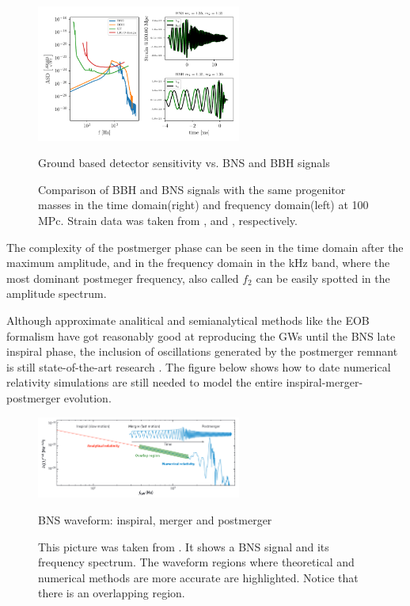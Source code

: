 \begin{figure}[hbt!]
\begin{center}
\includegraphics[width=0.6\textwidth, angle=0]{images/Data_analysis/sig_proc/BNS-BBH.pdf}
\captionsetup{width=0.8\textwidth}
\caption{Ground based detector sensitivity vs. BNS and BBH signals}
\caption*{Comparison of BBH and BNS signals with the same progenitor masses in the time domain(right) and frequency domain(left) at 100 MPc. Strain data was taken from \cite{Estelles:2020osj}, and \cite{Dietrich:2018phi}, respectively.}
\label{BBH and BNS}
\end{center}
\end{figure}

\FloatBarrier

The complexity of the postmerger phase can be seen in the time domain after the maximum amplitude, and in the frequency domain in the kHz band, where the most dominant postmeger frequency, also called $f_2$ can be easily spotted in the amplitude spectrum. 

Although approximate analitical and semianalytical methods like the EOB formalism \cite{Damour:2012yf,PhysRevD.96.121501,Dietrich:2018uni} have got reasonably good at reproducing the GWs until the BNS late inspiral phase, the inclusion of oscillations generated by the postmerger remnant is still state-of-the-art research \cite{Breschi:2019srl, Tsang:2019esi, Soultanis:2021oia, https://doi.org/10.48550/arxiv.2205.09112}. The figure below shows how to date numerical relativity simulations are still needed to model the entire inspiral-merger-postmerger evolution.


\begin{figure}[hbt!]
\begin{center}
\includegraphics[width=0.6\textwidth, angle=0]{images/postmerger.png}
\captionsetup{width=0.8\textwidth}
\caption{BNS waveform: inspiral, merger and postmerger}
\caption*{This picture was taken from \cite{Radice_2020}. It shows a BNS signal and its frequency spectrum. The waveform regions where theoretical and numerical methods are more accurate are highlighted. Notice that there is an overlapping region.}
\label{BBH and BNS2}
\end{center}
\end{figure}

